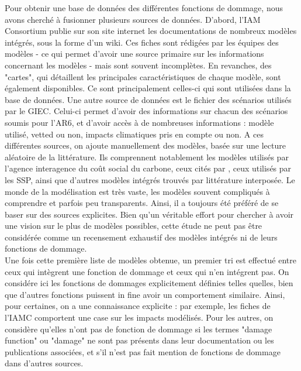 \begin{methodbox}
Pour obtenir une base de données des différentes fonctions de dommage, nous avons cherché à fusionner plusieurs sources de données. D'abord, l'IAM Consortium publie sur son site internet les documentations de nombreux modèles intégrés, sous la forme d'un wiki. Ces fiches sont rédigées par les équipes des modèles - ce qui permet d'avoir une source primaire sur les informations concernant les modèles - mais sont souvent incomplètes. En revanches, des "cartes", qui détaillent les principales caractéristiques de chaque modèle, sont également disponibles. Ce sont principalement celles-ci qui sont utilisées dans la base de données. Une autre source de données est le fichier des scénarios utilisés par le GIEC. Celui-ci permet d'avoir des informations sur chacun des scénarios soumis pour l'AR6, et d'avoir accès à de nombreuses informations : modèle utilisé, vetted ou non, impacts climatiques pris en compte ou non. A ces différentes sources, on ajoute manuellement des modèles, basée sur une lecture aléatoire de la littérature. Ils comprennent notablement les modèles utilisés par l'agence interagence du coût social du carbone, ceux cités par \textcite{souffron_successful_2024}, ceux utilisés par les SSP, ainsi que d'autres modèles intégrés trouvés par littérature interposée. 
Le monde de la modélisation est très vaste, les modèles souvent compliqués à comprendre et parfois peu transparents. Ainsi, il a toujours été préféré de se baser sur des sources explicites. Bien qu'un véritable effort pour chercher à avoir une vision sur le plus de modèles possibles, cette étude ne peut pas être considérée comme un recensement exhaustif des modèles intégrés ni de leurs fonctions de dommage. \\ 

Une fois cette première liste de modèles obtenue, un premier tri est effectué entre ceux qui intègrent une fonction de dommage et ceux qui n'en intégrent pas. On considére ici les fonctions de dommages explicitement définies telles quelles, bien que d'autres fonctions puissent in fine avoir un comportement similaire. Ainsi, pour certaines, on a une connaissance explicite : par exemple, les fiches de l'IAMC comportent une case sur les impacts modélisés. Pour les autres, on considère qu'elles n'ont pas de fonction de dommage si les termes "damage function" ou "damage" ne sont pas présents dans leur documentation ou les publications associées, et s'il n'est pas fait mention de fonctions de dommage dans d'autres sources. \\


\end{methodbox}
